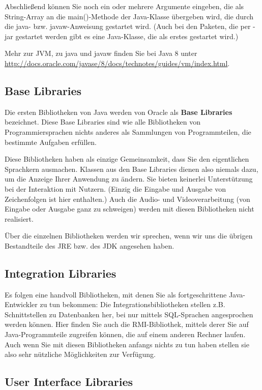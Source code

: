 Abschließend können Sie noch ein oder mehrere Argumente eingeben, die als String-Array an die main()-Methode der Java-Klasse übergeben wird, die durch die java- bzw. javaw-Anweisung gestartet wird. (Auch bei den Paketen, die per -jar gestartet werden gibt es eine Java-Klasse, die als erstes gestartet wird.)

Mehr zur JVM, zu java und javaw finden Sie bei Java 8 unter \url{http://docs.oracle.com/javase/8/docs/technotes/guides/vm/index.html}. 

\subsection{Base Libraries}

Die ersten Bibliotheken von Java werden von Oracle als \textbf{Base Libraries} bezeichnet. Diese Base Libraries sind wie alle Bibliotheken von Programmiersprachen nichts anderes als Sammlungen von Programmteilen, die bestimmte Aufgaben erfüllen.

Diese Bibliotheken haben als einzige Gemeinsamkeit, dass Sie den eigentlichen Sprachkern ausmachen. Klassen aus den Base Libraries dienen also niemals dazu, um die Anzeige Ihrer Anwendung zu ändern. Sie bieten keinerlei Unterstützung bei der Interaktion mit Nutzern. (Einzig die Eingabe und Ausgabe von Zeichenfolgen ist hier enthalten.) Auch die Audio- und Videoverarbeitung (von Eingabe oder Ausgabe ganz zu schweigen) werden mit diesen Bibliotheken nicht realisiert.

Über die einzelnen Bibliotheken werden wir sprechen, wenn wir uns die übrigen Bestandteile des JRE bzw. des JDK angesehen haben.

\subsection{Integration Libraries}

Es folgen eine handvoll Bibliotheken, mit denen Sie als fortgeschrittene Java-Entwickler zu tun bekommen: Die Integrationsbibliotheken stellen z.B. Schnittstellen zu Datenbanken her, bei nur mittels SQL-Sprachen angesprochen werden können. Hier finden Sie auch die RMI-Bibliothek, mittels derer Sie auf Java-Programmteile zugreifen können, die auf einem anderen Rechner laufen. Auch wenn Sie mit diesen Bibliotheken anfangs nichts zu tun haben stellen sie also sehr nützliche Möglichkeiten zur Verfügung.

\subsection{User Interface Libraries}

